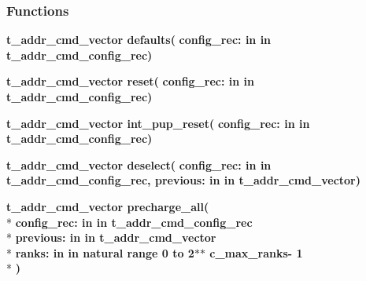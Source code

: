 \subsubsection*{Functions}
 \begin{DoxyCompactItemize}
\item 
{\bfseries {\bfseries {\bfseries {\bf t\+\_\+addr\+\_\+cmd\+\_\+vector}} \textcolor{vhdlchar}{ }}} {\bf defaults}{\bfseries  ( }{\bfseries \textcolor{vhdlchar}{config\+\_\+rec\+: }\textcolor{stringliteral}{in }\textcolor{vhdlchar}{in t\+\_\+addr\+\_\+cmd\+\_\+config\+\_\+rec}}{\bfseries  )} 
\item 
{\bfseries {\bfseries {\bfseries {\bf t\+\_\+addr\+\_\+cmd\+\_\+vector}} \textcolor{vhdlchar}{ }}} {\bf reset}{\bfseries  ( }{\bfseries \textcolor{vhdlchar}{config\+\_\+rec\+: }\textcolor{stringliteral}{in }\textcolor{vhdlchar}{in t\+\_\+addr\+\_\+cmd\+\_\+config\+\_\+rec}}{\bfseries  )} 
\item 
{\bfseries {\bfseries {\bfseries {\bf t\+\_\+addr\+\_\+cmd\+\_\+vector}} \textcolor{vhdlchar}{ }}} {\bf int\+\_\+pup\+\_\+reset}{\bfseries  ( }{\bfseries \textcolor{vhdlchar}{config\+\_\+rec\+: }\textcolor{stringliteral}{in }\textcolor{vhdlchar}{in t\+\_\+addr\+\_\+cmd\+\_\+config\+\_\+rec}}{\bfseries  )} 
\item 
{\bfseries {\bfseries {\bfseries {\bf t\+\_\+addr\+\_\+cmd\+\_\+vector}} \textcolor{vhdlchar}{ }}} {\bf deselect}{\bfseries  ( }{\bfseries \textcolor{vhdlchar}{config\+\_\+rec\+: }\textcolor{stringliteral}{in }\textcolor{vhdlchar}{in t\+\_\+addr\+\_\+cmd\+\_\+config\+\_\+rec}}{\bfseries  , \textcolor{vhdlchar}{previous\+: }\textcolor{stringliteral}{in }\textcolor{vhdlchar}{in t\+\_\+addr\+\_\+cmd\+\_\+vector}}{\bfseries  )} 
\item 
{\bfseries {\bfseries {\bfseries {\bf t\+\_\+addr\+\_\+cmd\+\_\+vector}} \textcolor{vhdlchar}{ }}} {\bf precharge\+\_\+all}{\bfseries  ( }\\*
{\bfseries \textcolor{vhdlchar}{config\+\_\+rec\+: }\textcolor{stringliteral}{in }\textcolor{vhdlchar}{in t\+\_\+addr\+\_\+cmd\+\_\+config\+\_\+rec}}\\*
{\bfseries \textcolor{vhdlchar}{previous\+: }\textcolor{stringliteral}{in }\textcolor{vhdlchar}{in t\+\_\+addr\+\_\+cmd\+\_\+vector}}\\*
{\bfseries \textcolor{vhdlchar}{ranks\+: }\textcolor{stringliteral}{in }\textcolor{vhdlchar}{in natural   range  0 to  2$\ast$$\ast$   c\+\_\+max\+\_\+ranks-\/ 1}}\\*
{\bfseries  )} 
\item 

\end{DoxyCompactItemize}
